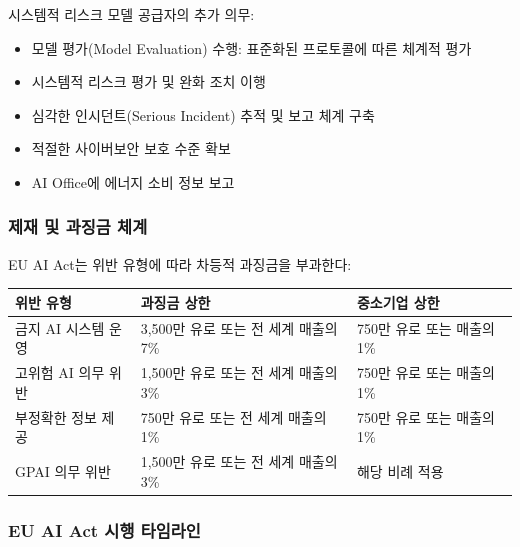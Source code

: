 시스템적 리스크 모델 공급자의 추가 의무:
\begin{itemize}
 \item 모델 평가(Model Evaluation) 수행: 표준화된 프로토콜에 따른 체계적 평가
 \item 시스템적 리스크 평가 및 완화 조치 이행
 \item 심각한 인시던트(Serious Incident) 추적 및 보고 체계 구축
 \item 적절한 사이버보안 보호 수준 확보
 \item AI Office에 에너지 소비 정보 보고
\end{itemize}

\subsubsection{제재 및 과징금 체계}

EU AI Act는 위반 유형에 따라 차등적 과징금을 부과한다:

\begin{center}
\renewcommand{\arraystretch}{1.3}
\small
\begin{tabularx}{\textwidth}{Xp{3cm}p{3cm}}
\toprule
\textbf{위반 유형} & \textbf{과징금 상한} & \textbf{중소기업 상한} \\
\midrule
금지 AI 시스템 운영 & 3,500만 유로 또는 전 세계 매출의 7\% & 750만 유로 또는 매출의 1\% \\
고위험 AI 의무 위반 & 1,500만 유로 또는 전 세계 매출의 3\% & 750만 유로 또는 매출의 1\% \\
부정확한 정보 제공 & 750만 유로 또는 전 세계 매출의 1\% & 750만 유로 또는 매출의 1\% \\
GPAI 의무 위반 & 1,500만 유로 또는 전 세계 매출의 3\% & 해당 비례 적용 \\
\bottomrule
\end{tabularx}
\end{center}

\subsubsection{EU AI Act 시행 타임라인}

